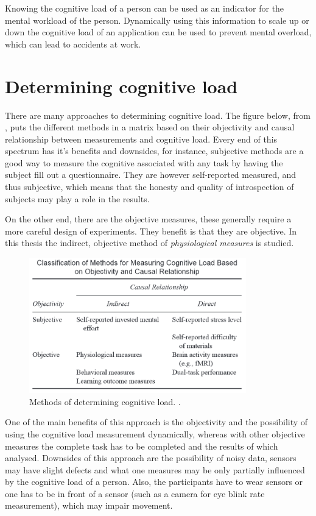 \documentclass[11pt,leqno,a4paper]{report} %
\begin{document}
Knowing the cognitive load of a person can be used as an indicator for the mental workload of the person. Dynamically using this information to scale up or down the cognitive load of an application can be used to prevent mental overload, which can lead to accidents at work.
 

\section{Determining cognitive load}

There are many approaches to determining cognitive load. The figure below, from \citet{brunken2003direct}, puts the different methods in a matrix based on their objectivity and causal relationship between measurements and cognitive load. Every end of this spectrum has it's benefits and downsides, for instance, subjective methods are a good way to measure the cognitive associated with any task by having the subject fill out a questionnaire. They are however self-reported measured, and thus subjective, which means that the honesty and quality of introspection of subjects may play a role in the results.

On the other end, there are the objective measures, these generally require a more careful design of experiments. They benefit is that they are objective. In this thesis the indirect, objective method of \emph{physiological measures} is studied. 

\begin{figure}[H]
  \centering   
    \includegraphics[width=0.84\textwidth]{meas.png}
  \caption{Methods of determining cognitive load. \citep{brunken2003direct}.}
\end{figure}


One of the main benefits of this approach is the objectivity and the possibility of using the cognitive load measurement dynamically, whereas with other objective measures the complete task has to be completed and the results of which analysed.
Downsides of this approach are the possibility of noisy data, sensors may have slight defects and what one measures may be only partially influenced by the cognitive load of a person. Also, the participants have to wear sensors or one has to be in front of a sensor (such as a camera for eye blink rate measurement), which may impair movement. 
\end{document}
